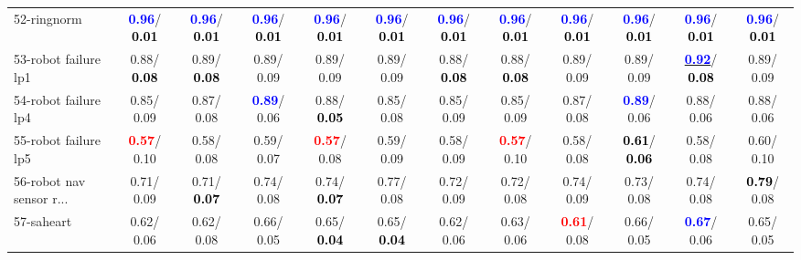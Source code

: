 \begin{table}[h]
\begin{center}
{\begin{tabular}{lc|c|c|c|c|c|c|c|c|c|c}
52-ringnorm & \textcolor{blue}{\textbf{  0.96}}/\textcolor{black}{\textbf{  0.01}} & \textcolor{blue}{\textbf{  0.96}}/\textcolor{black}{\textbf{  0.01}} & \textcolor{blue}{\textbf{  0.96}}/\textcolor{black}{\textbf{  0.01}} & \textcolor{blue}{\textbf{  0.96}}/\textcolor{black}{\textbf{  0.01}} & \textcolor{blue}{\textbf{  0.96}}/\textcolor{black}{\textbf{  0.01}} & \textcolor{blue}{\textbf{  0.96}}/\textcolor{black}{\textbf{  0.01}} & \textcolor{blue}{\textbf{  0.96}}/\textcolor{black}{\textbf{  0.01}} & \textcolor{blue}{\textbf{  0.96}}/\textcolor{black}{\textbf{  0.01}} & \textcolor{blue}{\textbf{  0.96}}/\textcolor{black}{\textbf{  0.01}} & \textcolor{blue}{\textbf{  0.96}}/\textcolor{black}{\textbf{  0.01}} & \textcolor{blue}{\textbf{  0.96}}/\textcolor{black}{\textbf{  0.01}} \\
53-robot failure lp1 &   0.88/\textcolor{black}{\textbf{  0.08}} &   0.89/\textcolor{black}{\textbf{  0.08}} &   0.89/  0.09 &   0.89/  0.09 &   0.89/  0.09 &   0.88/\textcolor{black}{\textbf{  0.08}} &   0.88/\textcolor{black}{\textbf{  0.08}} &   0.89/  0.09 &   0.89/  0.09 & \underline{\textcolor{blue}{\textbf{  0.92}}}/\textcolor{black}{\textbf{  0.08}} &   0.89/  0.09 \\ \hline
54-robot failure lp4 &   0.85/  0.09 &   0.87/  0.08 & \textcolor{blue}{\textbf{  0.89}}/  0.06 &   0.88/\textcolor{black}{\textbf{  0.05}} &   0.85/  0.08 &   0.85/  0.09 &   0.85/  0.09 &   0.87/  0.08 & \textcolor{blue}{\textbf{  0.89}}/  0.06 &   0.88/  0.06 &   0.88/  0.06 \\
55-robot failure lp5 & \textcolor{red}{\textbf{  0.57}}/  0.10 &   0.58/  0.08 &   0.59/  0.07 & \textcolor{red}{\textbf{  0.57}}/  0.08 &   0.59/  0.09 &   0.58/  0.09 & \textcolor{red}{\textbf{  0.57}}/  0.10 &   0.58/  0.08 & \textcolor{black}{\textbf{  0.61}}/\textcolor{black}{\textbf{  0.06}} &   0.58/  0.08 &   0.60/  0.10 \\
56-robot nav sensor r... &   0.71/  0.09 &   0.71/\textcolor{black}{\textbf{  0.07}} &   0.74/  0.08 &   0.74/\textcolor{black}{\textbf{  0.07}} &   0.77/  0.08 &   0.72/  0.09 &   0.72/  0.08 &   0.74/  0.09 &   0.73/  0.08 &   0.74/  0.08 & \textcolor{black}{\textbf{  0.79}}/  0.08 \\
57-saheart &   0.62/  0.06 &   0.62/  0.08 &   0.66/  0.05 &   0.65/\textcolor{black}{\textbf{  0.04}} &   0.65/\textcolor{black}{\textbf{  0.04}} &   0.62/  0.06 &   0.63/  0.06 & \textcolor{red}{\textbf{  0.61}}/  0.08 &   0.66/  0.05 & \textcolor{blue}{\textbf{  0.67}}/  0.06 &   0.65/  0.05 \\

\end{tabular}}
\end{center}
\end{table}
